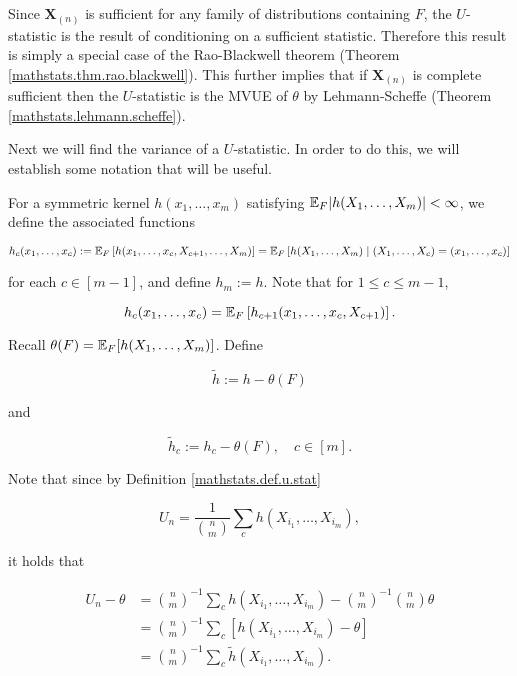\begin{remark}

Since \(\boldsymbol{X}_{(n)}\) is sufficient for any family of distributions containing \(F\), the \(U\)-statistic is the result of conditioning on a sufficient statistic. Therefore this result is simply a special case of the Rao-Blackwell theorem (Theorem \ref{mathstats.thm.rao.blackwell}). This further implies that if \(\boldsymbol{X}_{(n)}\) is complete sufficient then the \(U\)-statistic is the MVUE of \(\theta\) by Lehmann-Scheffe (Theorem \ref{mathstats.lehmann.scheffe}). 

\end{remark}

Next we will find the variance of a \(U\)-statistic. In order to do this, we will establish some notation that will be useful.

\begin{definition}


For a symmetric kernel \(h(x_1, \ldots, x_m)\) satisfying \(\E_F| h(X_1, \ldots, X_m)| < \infty\), we define the associated functions

\[
h_c(x_1, \ldots, x_c) := \E_F \left[ h(x_1, \ldots, x_c, X_{c+1}, \ldots, X_m) \right] = \E_F \left[ h(X_1, \ldots,  X_m)  \mid (X_1, \ldots, X_c) = (x_1, \ldots, x_c) \right] 
\]

for each \(c \in [m-1]\), and define \(h_m := h\). Note that for \(1 \leq c \leq m -1\),

\[
h_c(x_1, \ldots, x_c) = \E_F\left[ h_{c+1}(x_1, \ldots, x_c, X_{c+1}) \right].
\]

Recall \(\theta(F) = \E_F[h(X_1, \ldots, X_m)]\). Define

\[
\tilde{h} := h - \theta(F)
\]

and

\[
\tilde{h}_c := h_c - \theta(F), \quad c \in [m].
\]

\end{definition}


\begin{remark}

Note that since by Definition \ref{mathstats.def.u.stat}

\[
U_n = \frac{1}{\binom{n}{m}} \sum_c h(X_{i_1}, \ldots, X_{i_m}),
\]

it holds that

\begin{align}
U_n - \theta  & =  \binom{n}{m}^{-1} \sum_c h(X_{i_1}, \ldots, X_{i_m}) - \binom{n}{m}^{-1} \binom{n}{m} \theta \nonumber
\\  & = \binom{n}{m}^{-1} \sum_c \left[ h(X_{i_1}, \ldots, X_{i_m}) - \theta \right] \nonumber
\\  & = \binom{n}{m}^{-1} \sum_c \tilde{h}(X_{i_1}, \ldots, X_{i_m}). \label{mathstats.u.id.var}
\end{align}

\end{remark}


